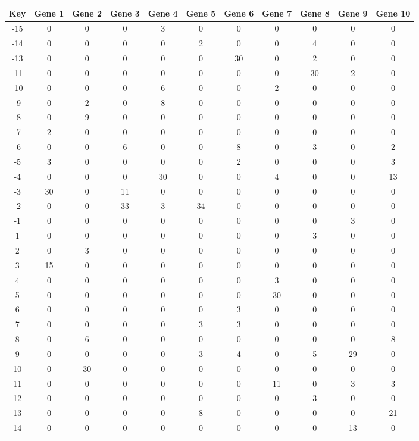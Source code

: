 \begin{tabular}{|c|c|c|c|c|c|c|c|c|c|c|}
\hline
Key & Gene 1 & Gene 2 & Gene 3 & Gene 4 & Gene 5 & Gene 6 & Gene 7 & Gene 8 & Gene 9 & Gene 10 \\
\hline
-15 & 0 & 0 & 0 & 3 & 0 & 0 & 0 & 0 & 0 & 0 \\
-14 & 0 & 0 & 0 & 0 & 2 & 0 & 0 & 4 & 0 & 0 \\
-13 & 0 & 0 & 0 & 0 & 0 & 30 & 0 & 2 & 0 & 0 \\
-11 & 0 & 0 & 0 & 0 & 0 & 0 & 0 & 30 & 2 & 0 \\
-10 & 0 & 0 & 0 & 6 & 0 & 0 & 2 & 0 & 0 & 0 \\
-9 & 0 & 2 & 0 & 8 & 0 & 0 & 0 & 0 & 0 & 0 \\
-8 & 0 & 9 & 0 & 0 & 0 & 0 & 0 & 0 & 0 & 0 \\
-7 & 2 & 0 & 0 & 0 & 0 & 0 & 0 & 0 & 0 & 0 \\
-6 & 0 & 0 & 6 & 0 & 0 & 8 & 0 & 3 & 0 & 2 \\
-5 & 3 & 0 & 0 & 0 & 0 & 2 & 0 & 0 & 0 & 3 \\
-4 & 0 & 0 & 0 & 30 & 0 & 0 & 4 & 0 & 0 & 13 \\
-3 & 30 & 0 & 11 & 0 & 0 & 0 & 0 & 0 & 0 & 0 \\
-2 & 0 & 0 & 33 & 3 & 34 & 0 & 0 & 0 & 0 & 0 \\
-1 & 0 & 0 & 0 & 0 & 0 & 0 & 0 & 0 & 3 & 0 \\
1 & 0 & 0 & 0 & 0 & 0 & 0 & 0 & 3 & 0 & 0 \\
2 & 0 & 3 & 0 & 0 & 0 & 0 & 0 & 0 & 0 & 0 \\
3 & 15 & 0 & 0 & 0 & 0 & 0 & 0 & 0 & 0 & 0 \\
4 & 0 & 0 & 0 & 0 & 0 & 0 & 3 & 0 & 0 & 0 \\
5 & 0 & 0 & 0 & 0 & 0 & 0 & 30 & 0 & 0 & 0 \\
6 & 0 & 0 & 0 & 0 & 0 & 3 & 0 & 0 & 0 & 0 \\
7 & 0 & 0 & 0 & 0 & 3 & 3 & 0 & 0 & 0 & 0 \\
8 & 0 & 6 & 0 & 0 & 0 & 0 & 0 & 0 & 0 & 8 \\
9 & 0 & 0 & 0 & 0 & 3 & 4 & 0 & 5 & 29 & 0 \\
10 & 0 & 30 & 0 & 0 & 0 & 0 & 0 & 0 & 0 & 0 \\
11 & 0 & 0 & 0 & 0 & 0 & 0 & 11 & 0 & 3 & 3 \\
12 & 0 & 0 & 0 & 0 & 0 & 0 & 0 & 3 & 0 & 0 \\
13 & 0 & 0 & 0 & 0 & 8 & 0 & 0 & 0 & 0 & 21 \\
14 & 0 & 0 & 0 & 0 & 0 & 0 & 0 & 0 & 13 & 0 \\
\hline
\end{tabular}